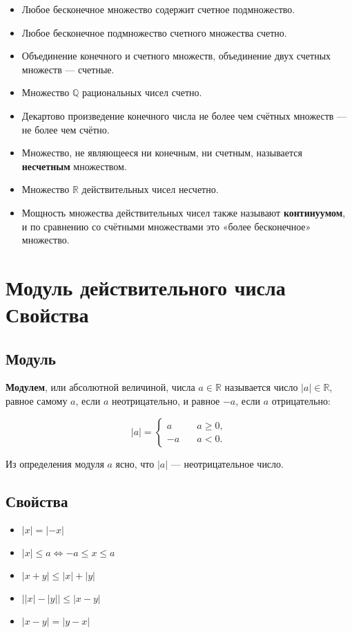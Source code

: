 \begin{itemize}
    \setlength\itemsep{-0.2em}
    \item Любое бесконечное множество содержит счетное подмножество.
    \item Любое бесконечное подмножество счетного множества счетно.
    \item Объединение конечного и счетного множеств, объединение двух счетных множеств — счетные.
    \item Множество $\mathbb{Q}$ рациональных чисел счетно.
    \item Декартово произведение конечного числа не более чем счётных множеств — не более чем счётно.
    \item Множество, не являющееся ни конечным, ни счетным, называется \textbf{несчетным} множеством.
    \item Множество $\mathbb{R}$ действительных чисел несчетно.
    \item Мощность множества действительных чисел также называют \textbf{континуумом}, и по сравнению со счётными множествами это «более бесконечное» множество.
\end{itemize}
\newpage

\section{Модуль действительного числа\\ {\normalfont Свойства}}
\subsection{Модуль}

\textbf{Модулем}, или абсолютной величиной, числа $a \in \mathbb{R}$ называется число $\lvert a\rvert \in \mathbb{R}$, равное самому $a$, если $a$ неотрицательно, и равное $-a$, если $a$ отрицательно:

\[ \lvert a\rvert =
  \begin{cases}
    a       & \quad a \geqslant 0,\\
    -a      & \quad a < 0.
  \end{cases}
\]

Из определения модуля $a$ ясно, что $\lvert a\rvert$ — неотрицательное число.

\subsection{Свойства}

\begin{itemize}
    \setlength\itemsep{-0.2em}
    \item $\lvert x\rvert = \lvert-x\rvert$
    \item $\lvert x\rvert \leqslant a \Leftrightarrow -a \leqslant x \leqslant a$
    \item $\lvert x+y\rvert \leqslant \lvert x\rvert + \lvert y\rvert$
    \item $\lvert \lvert x\rvert - \lvert y\rvert\rvert \leqslant \lvert x - y\rvert$
    \item $\lvert x - y\rvert = \lvert y - x\rvert$
\end{itemize}

